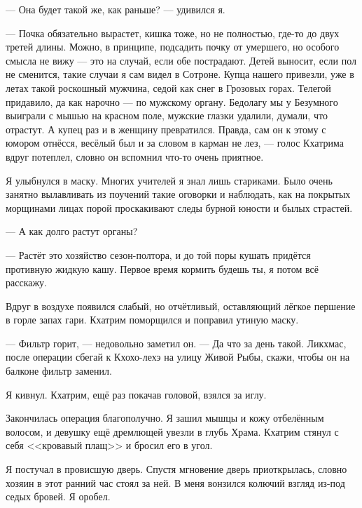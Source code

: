 --- Она будет такой же, как раньше? --- удивился я.

--- Почка обязательно вырастет, кишка тоже, но не полностью, где-то до двух третей длины.
Можно, в принципе, подсадить почку от умершего, но особого смысла не вижу --- это на случай, если обе пострадают.
Детей выносит, если пол не сменится, такие случаи я сам видел в Сотроне.
Купца нашего привезли, уже в летах такой роскошный мужчина, седой как снег в Грозовых горах.
Телегой придавило, да как нарочно --- по мужскому органу.
Бедолагу мы у Безумного выиграли с мышью на красном поле\FM, мужские глазки удалили, думали, что отрастут.
А купец раз и в женщину превратился.
Правда, сам он к этому с юмором отнёсся, весёлый был и за словом в карман не лез, --- голос Кхатрима вдруг потеплел, словно он вспомнил что-то очень приятное.

Я улыбнулся в маску.
Многих учителей я знал лишь стариками.
Было очень занятно вылавливать из поучений такие оговорки и наблюдать, как на покрытых морщинами лицах порой проскакивают следы бурной юности и былых страстей.

--- А как долго растут органы?

--- Растёт это хозяйство сезон-полтора, и до той поры кушать придётся противную жидкую кашу.
Первое время кормить будешь ты, я потом всё расскажу.

Вдруг в воздухе появился слабый, но отчётливый, оставляющий лёгкое першение в горле запах гари.
Кхатрим поморщился и поправил утиную маску.

--- Фильтр горит, --- недовольно заметил он.
--- Да что за день такой.
Ликхмас, после операции сбегай к Кхохо-лехэ на улицу Живой Рыбы, скажи, чтобы он на балконе фильтр заменил.

Я кивнул.
Кхатрим, ещё раз покачав головой, взялся за иглу.

Закончилась операция благополучно.
Я зашил мышцы и кожу отбелённым волосом, и девушку ещё дремлющей увезли в глубь Храма.
Кхатрим стянул с себя <<кровавый плащ>> и бросил его в угол.

\asterism

\textspace

Я постучал в провисшую дверь.
Спустя мгновение дверь приоткрылась, словно хозяин в этот ранний час стоял за ней.
В меня вонзился колючий взгляд из-под седых бровей.
Я оробел.


